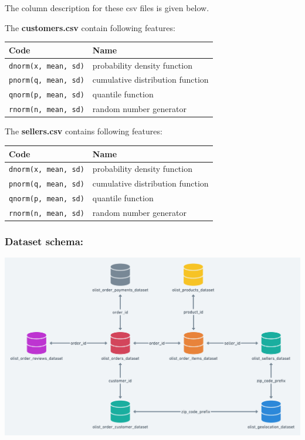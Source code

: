 \documentclass[
]{article}
\begin{document}
The column description for these csv files is given below.

The \textbf{customers.csv} contain following features:

\begin{longtable}[]{@{}ll@{}}
\toprule\noalign{}
Code & Name \\
\midrule\noalign{}
\endhead
\bottomrule\noalign{}
\endlastfoot
\texttt{dnorm(x,\ mean,\ sd)} & probability density function \\
\texttt{pnorm(q,\ mean,\ sd)} & cumulative distribution function \\
\texttt{qnorm(p,\ mean,\ sd)} & quantile function \\
\texttt{rnorm(n,\ mean,\ sd)} & random number generator \\
\end{longtable}

The \textbf{sellers.csv} contains following features:

\begin{longtable}[]{@{}ll@{}}
\toprule\noalign{}
Code & Name \\
\midrule\noalign{}
\endhead
\bottomrule\noalign{}
\endlastfoot
\texttt{dnorm(x,\ mean,\ sd)} & probability density function \\
\texttt{pnorm(q,\ mean,\ sd)} & cumulative distribution function \\
\texttt{qnorm(p,\ mean,\ sd)} & quantile function \\
\texttt{rnorm(n,\ mean,\ sd)} & random number generator \\
\end{longtable}

\subsubsection{Dataset schema:}\label{dataset-schema}

\includegraphics{dbDiag.png}
\end{document}
